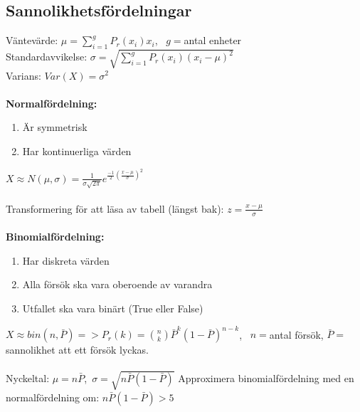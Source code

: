 \documentclass[a4paper,10pt]{article}
\begin{document}
\newpage

\subsection*{Sannolikhetsfördelningar}
Väntevärde: $\mu = \sum_{i=1}^g P_r(x_i) x_i$, \, $g=$antal enheter \\
Standardavvikelse: $\sigma = \sqrt{\sum_{i=1}^g P_r(x_i) (x_i - \mu)^2}$ \\
Varians: $Var(X) = \sigma^2$ \\
\vspace{1mm} \\
{\bf Normalfördelning:}
\begin{enumerate}
    \item{Är symmetrisk}
    \item{Har kontinuerliga värden}
\end{enumerate}
$X \approx N(\mu, \sigma) = \frac{1}{\sigma\sqrt{2\pi}}e^{\frac{-1}{2}(\frac{x-\mu}{\sigma})^2}$ \\
\vspace{1mm}\\
Transformering för att läsa av tabell (längst bak): $z = \frac{x-\mu}{\sigma}$ \\
\vspace{1mm} \\
{\bf Binomialfördelning:}
\begin{enumerate}
    \item{Har diskreta värden}
    \item{Alla försök ska vara oberoende av varandra}
    \item{Utfallet ska vara binärt (True eller False)}
\end{enumerate}
$X \approx bin(n, \bar{P}) => P_r(k) = \binom{n}{k} \bar{P}^k(1-\bar{P})^{n-k}$, \, $n=$antal försök, $\bar{P}=$sannolikhet att ett försök lyckas. \\
\vspace{1mm}\\
Nyckeltal: $\mu=n\bar{P}$,\, $\sigma=\sqrt{n\bar{P}(1-\bar{P})}$
Approximera binomialfördelning med en normalfördelning om: $n\bar{P}(1-\bar{P}) > 5$




\end{document}
